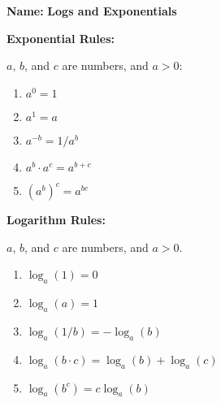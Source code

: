 \documentclass{article}
\newcommand{\greybox}[2]{\begin{tcolorbox}\textbf{#1:}\\ {#2}\end{tcolorbox}}
\begin{document}
\noindent \textbf{Name:}\underline{\hspace{2in}} \hfill \textbf{Logs and Exponentials}

\begin{multicols}{2}
  \greybox{Exponential Rules}{$a$, $b$, and $c$ are numbers, and $a > 0$:
    \begin{enumerate}
    \item $a^0 = 1$
    \item $a^1 = a$
    \item $a^{-b} = 1 / a^b$
    \item $a^b \cdot a^c = a^{b + c}$
    \item $(a^b)^c = a^{bc}$
    \end{enumerate}
  }
  \greybox{Logarithm Rules}{
    $a$, $b$, and $c$ are numbers, and $a > 0$.
    \begin{enumerate}
    \item $\log_a(1) = 0$
    \item $\log_a(a) = 1$
    \item $\log_a(1/b) = - \log_a(b)$
    \item $\log_a(b \cdot c) = \log_a(b) + \log_a(c)$
    \item $\log_a(b^c) = c \log_a(b)$
    \end{enumerate}
  }
  
\end{multicols}
\end{document}
